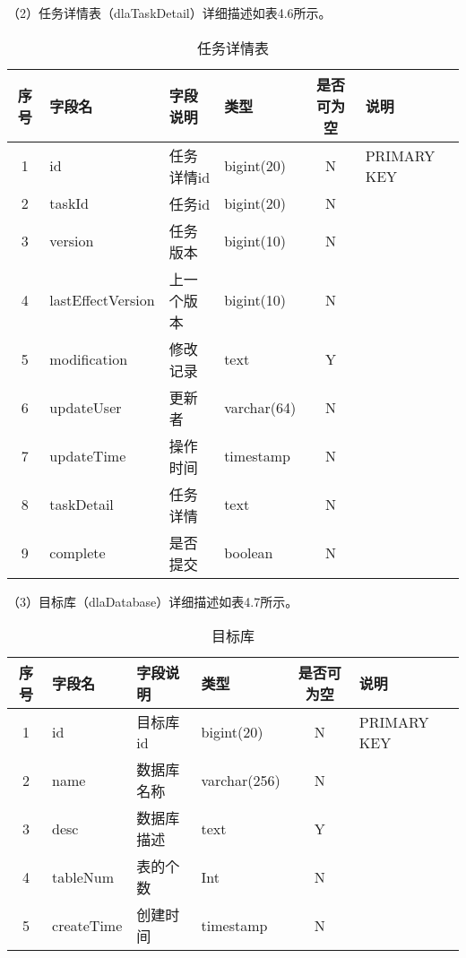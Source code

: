 （2）任务详情表（dlaTaskDetail）详细描述如表4.6所示。

\begin{table}[h]
  \centering
  \caption{任务详情表}
  \label{tab:exampletable}
  \begin{tabular}{clllcl}
    \toprule
    序号  & 字段名              & 字段说明     & 类型           & 是否可为空   & 说明  \\
    \midrule
    1    & id                 & 任务详情id   & bigint(20)     & N          & PRIMARY KEY    \\
    2    & taskId             & 任务id      & bigint(20)     & N          &    \\
    3    & version            & 任务版本     & bigint(10)     & N          &   \\
    4    & lastEffectVersion  & 上一个版本   & bigint(10)     & N          &   \\
    5    & modification       & 修改记录     & text           & Y          &   \\
    6    & updateUser         & 更新者       & varchar(64)   & N          &    \\
    7    & updateTime         & 操作时间     & timestamp      & N          &   \\
    8    & taskDetail         & 任务详情     & text           & N          &   \\
    9    & complete           & 是否提交     & boolean        & N          &   \\
    \bottomrule
  \end{tabular}
\end{table}

（3）目标库（dlaDatabase）详细描述如表4.7所示。

\begin{table}[h]
  \centering
  \caption{目标库}
  \label{tab:exampletable}
  \begin{tabular}{clllcl}
    \toprule
    序号  & 字段名              & 字段说明     & 类型           & 是否可为空   & 说明  \\
    \midrule
    1    & id                 & 目标库id     & bigint(20)    & N          & PRIMARY KEY    \\
    2    & name               & 数据库名称    & varchar(256)  & N          &    \\
    3    & desc               & 数据库描述    & text          & Y          &   \\
    4    & tableNum           & 表的个数      & Int           & N          &   \\
    5    & createTime         & 创建时间      & timestamp     & N          &   \\
    \bottomrule
  \end{tabular}
\end{table}

